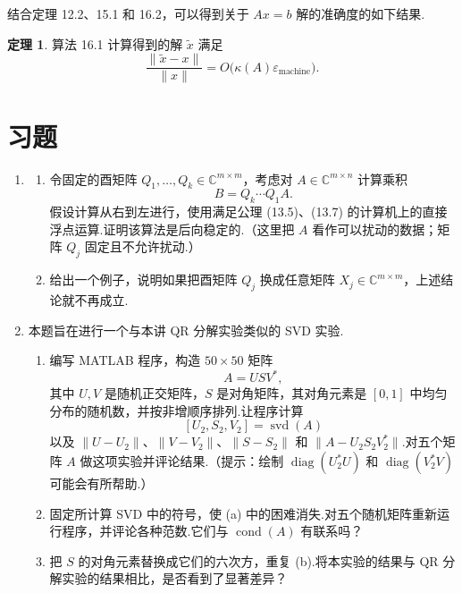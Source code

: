\documentclass[UTF8,fontset=none,12pt]{ctexart}
\newcommand{\C}{\mathbb{C}}
\newcommand{\epsmach}{\varepsilon_{\mathrm{machine}}}
\theoremstyle{definition}
\newtheorem{theorem}{定理}
\begin{document}
结合定理 12.2、15.1 和 16.2，可以得到关于 $Ax=b$ 解的准确度的如下结果.

\begin{theorem}
算法 16.1 计算得到的解 $\widetilde x$ 满足
\begin{equation}
    \frac{\|\widetilde x-x\|}{\|x\|}
    =O\bigl(\kappa(A)\epsmach\bigr).
    \tag{16.7}
\end{equation}
\end{theorem}

\section*{习题}

\begin{enumerate}[label=\textbf{16.\arabic*}]
    \item
    \begin{enumerate}[label=(\alph*)]
        \item 令固定的酉矩阵 $Q_1,\ldots,Q_k\in\C^{m\times m}$，考虑对 $A\in\C^{m\times n}$ 计算乘积
        \[
            B=Q_k\cdots Q_1A.
        \]
        假设计算从右到左进行，使用满足公理 (13.5)、(13.7) 的计算机上的直接浮点运算.证明该算法是后向稳定的.（这里把 $A$ 看作可以扰动的数据；矩阵 $Q_j$ 固定且不允许扰动.）
        \item 给出一个例子，说明如果把酉矩阵 $Q_j$ 换成任意矩阵 $X_j\in\C^{m\times m}$，上述结论就不再成立.
    \end{enumerate}

    \item 本题旨在进行一个与本讲 QR 分解实验类似的 SVD 实验.
    \begin{enumerate}[label=(\alph*)]
        \item 编写 MATLAB 程序，构造 $50\times50$ 矩阵
        \[
            A=U S V^*,
        \]
        其中 $U,V$ 是随机正交矩阵，$S$ 是对角矩阵，其对角元素是 $[0,1]$ 中均匀分布的随机数，并按非增顺序排列.让程序计算
        \[
            [U_2,S_2,V_2]=\operatorname{svd}(A)
        \]
        以及 $\|U-U_2\|$、$\|V-V_2\|$、$\|S-S_2\|$ 和 $\|A-U_2S_2V_2^*\|$.对五个矩阵 $A$ 做这项实验并评论结果.（提示：绘制 $\operatorname{diag}(U_2^*U)$ 和 $\operatorname{diag}(V_2^*V)$ 可能会有所帮助.）
        \item 固定所计算 SVD 中的符号，使 (a) 中的困难消失.对五个随机矩阵重新运行程序，并评论各种范数.它们与 $\operatorname{cond}(A)$ 有联系吗？
        \item 把 $S$ 的对角元素替换成它们的六次方，重复 (b).将本实验的结果与 QR 分解实验的结果相比，是否看到了显著差异？
    \end{enumerate}
\end{enumerate}
\end{document}
